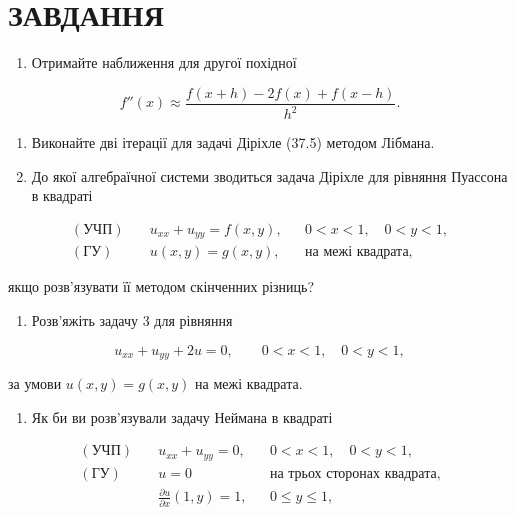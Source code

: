 \documentclass[
  ukrainian,
]{article}
\providecommand{\tightlist}{%
  \setlength{\itemsep}{0pt}\setlength{\parskip}{0pt}}
\begin{document}
\section{ЗАВДАННЯ}\label{ux437ux430ux432ux434ux430ux43dux43dux44f-18}

\begin{enumerate}
\def\labelenumi{\arabic{enumi}.}
\tightlist
\item
  Отримайте наближення для другої похідної
\end{enumerate}

\[
f''(x)\approx \frac{f(x+h)-2f(x)+f(x-h)}{h^2}.
\]

\begin{enumerate}
\def\labelenumi{\arabic{enumi}.}
\setcounter{enumi}{1}
\item
  Виконайте дві ітерації для задачі Діріхле (37.5) методом Лібмана.
\item
  До якої алгебраїчної системи зводиться задача Діріхле для рівняння
  Пуассона в квадраті
\end{enumerate}

\[
\begin{aligned}(\text{УЧП})\quad & u_{xx}+u_{yy}=f(x,y), && 0<x<1,\quad 0<y<1,\\(\text{ГУ})\quad & u(x,y)=g(x,y), && \text{на межі квадрата},\end{aligned}
\]

якщо розв'язувати її методом скінченних різниць?

\begin{enumerate}
\def\labelenumi{\arabic{enumi}.}
\setcounter{enumi}{3}
\tightlist
\item
  Розв'яжіть задачу 3 для рівняння
\end{enumerate}

\[
u_{xx}+u_{yy}+2u=0,\qquad 0<x<1,\quad 0<y<1,
\]

за умови \(u(x,y)=g(x,y)\) на межі квадрата.

\begin{enumerate}
\def\labelenumi{\arabic{enumi}.}
\setcounter{enumi}{4}
\tightlist
\item
  Як би ви розв'язували задачу Неймана в квадраті
\end{enumerate}

\[
\begin{aligned}(\text{УЧП})\quad & u_{xx}+u_{yy}=0, && 0<x<1,\quad 0<y<1,\\(\text{ГУ})\quad & u=0 && \text{на трьох сторонах квадрата},\\& \frac{\partial u}{\partial x}(1,y)=1, && 0\le y\le 1,\end{aligned}
\]
\end{document}
